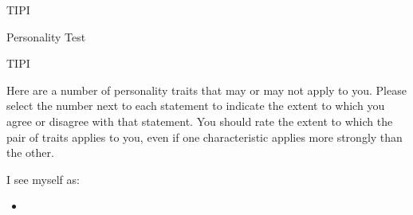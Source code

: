 
\begin{edXchapter}{TIPI}


\begin{edXsection}{Personality Test}

\begin{edXproblem}{TIPI}

Here are a number of personality traits that may or may not apply to you.  Please select the number next to each statement to indicate the extent to which you agree or disagree with that statement. You should rate the extent to which the pair of traits applies to you, even if one characteristic applies more strongly than the other.           
 
I see myself as:

\begin{itemize}
\item {} 
\end{itemize}
%


\end{edXproblem}
\end{edXsection}
\end{edXchapter}
